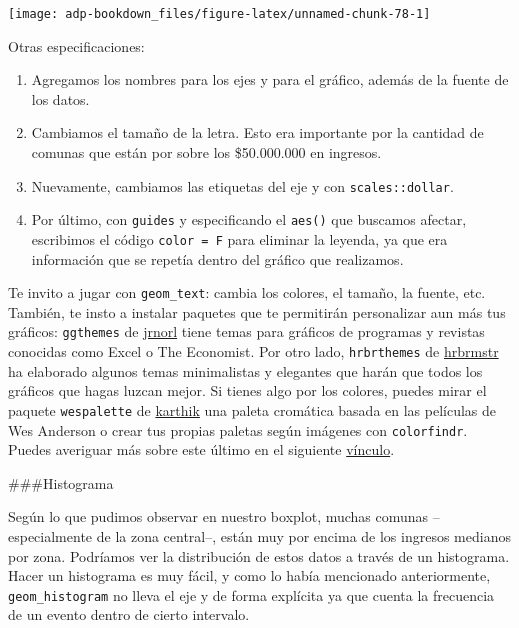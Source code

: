 \documentclass[]{book}
\begin{document}
\begin{center}\texttt{[image: adp-bookdown\_files/figure-latex/unnamed-chunk-78-1]} \end{center}

Otras especificaciones:

\begin{enumerate}
\def\labelenumi{\arabic{enumi}.}
\item
  Agregamos los nombres para los ejes y para el gráfico, además de la
  fuente de los datos.
\item
  Cambiamos el tamaño de la letra. Esto era importante por la cantidad
  de comunas que están por sobre los \$50.000.000 en ingresos.
\item
  Nuevamente, cambiamos las etiquetas del eje y con
  \texttt{scales::dollar}.
\item
  Por último, con \texttt{guides} y especificando el \texttt{aes()} que
  buscamos afectar, escribimos el código \texttt{color\ =\ F} para
  eliminar la leyenda, ya que era información que se repetía dentro del
  gráfico que realizamos.
\end{enumerate}

Te invito a jugar con \texttt{geom\_text}: cambia los colores, el
tamaño, la fuente, etc. También, te insto a instalar paquetes que te
permitirán personalizar aun más tus gráficos: \texttt{ggthemes} de
\href{https://github.com/jrnold/ggthemes}{jrnorl} tiene temas para
gráficos de programas y revistas conocidas como Excel o The Economist.
Por otro lado, \texttt{hrbrthemes} de
\href{https://github.com/hrbrmstr/hrbrthemes}{hrbrmstr} ha elaborado
algunos temas minimalistas y elegantes que harán que todos los gráficos
que hagas luzcan mejor. Si tienes algo por los colores, puedes mirar el
paquete \texttt{wespalette} de
\href{https://github.com/karthik/wesanderson}{karthik} una paleta
cromática basada en las películas de Wes Anderson o crear tus propias
paletas según imágenes con \texttt{colorfindr}. Puedes averiguar más
sobre este último en el siguiente
\href{https://github.com/zumbov2/colorfindr}{vínculo}.

\#\#\#Histograma

Según lo que pudimos observar en nuestro boxplot, muchas comunas
--especialmente de la zona central--, están muy por encima de los
ingresos medianos por zona. Podríamos ver la distribución de estos datos
a través de un histograma. Hacer un histograma es muy fácil, y como lo
había mencionado anteriormente, \texttt{geom\_histogram} no lleva el eje
y de forma explícita ya que cuenta la frecuencia de un evento dentro de
cierto intervalo.
\end{document}
